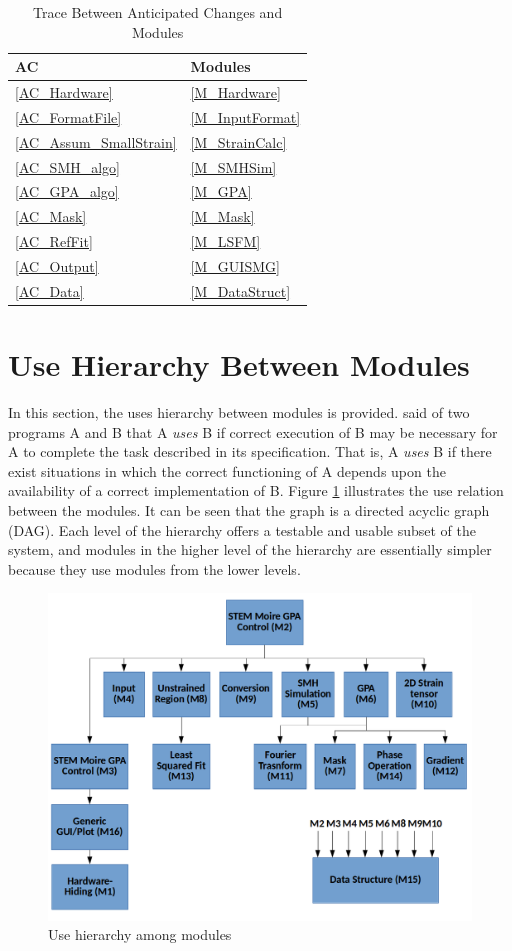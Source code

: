 \documentclass[12pt, titlepage]{article}
\begin{document}
\begin{table}[H]
\centering
\begin{tabular}{p{} p{}}
\toprule
\textbf{AC} & \textbf{Modules}\\
\midrule
\cref{AC_Hardware} & \cref{M_Hardware}\\
\cref{AC_FormatFile} & \cref{M_InputFormat}\\
\cref{AC_Assum_SmallStrain} & \cref{M_StrainCalc}\\
\cref{AC_SMH_algo} & \cref{M_SMHSim}\\
\cref{AC_GPA_algo} & \cref{M_GPA}\\
\cref{AC_Mask} & \cref{M_Mask}\\
\cref{AC_RefFit} & \cref{M_LSFM}\\
\cref{AC_Output} & \cref{M_GUISMG}\\
\cref{AC_Data} & \cref{M_DataStruct}\\
\bottomrule
\end{tabular}
\caption{Trace Between Anticipated Changes and Modules}
\label{TblACT}
\end{table}

\section{Use Hierarchy Between Modules} \label{SecUse}

In this section, the uses hierarchy between modules is
provided. \cite{Parnas1978} said of two programs A and B that A {\em uses} B if
correct execution of B may be necessary for A to complete the task described in
its specification. That is, A {\em uses} B if there exist situations in which
the correct functioning of A depends upon the availability of a correct
implementation of B.  Figure \ref{FigUH} illustrates the use relation between
the modules. It can be seen that the graph is a directed acyclic graph
(DAG). Each level of the hierarchy offers a testable and usable subset of the
system, and modules in the higher level of the hierarchy are essentially simpler
because they use modules from the lower levels.

\begin{figure}[H]
\centering
\includegraphics[width=\linewidth]{Figure_Hierarchy_update.png}
\caption{Use hierarchy among modules}
\label{FigUH}
\end{figure}

\newpage



\end{document}
